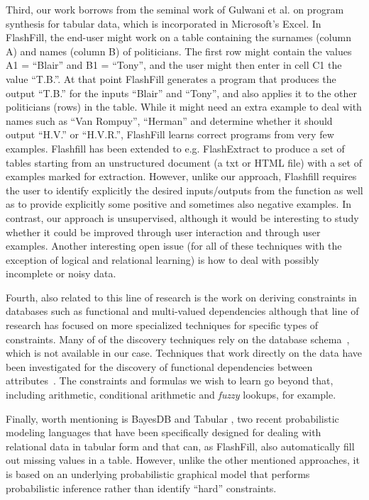 Third, our work borrows from the seminal work of Gulwani et al. \cite{flashfill} on program synthesis for tabular data, which is incorporated in Microsoft’s Excel. In FlashFill, the end-user might work on a table containing the surnames (column A) and names (column B) of politicians. The first row might contain the values A1 = ``Blair'' and B1 = ``Tony'', and the user might then enter in cell C1 the value ``T.B.''. At that point FlashFill generates a program that produces the output ``T.B.'' for the inputs ``Blair'' and ``Tony'', and also applies it to the other politicians (rows) in the table. While it might need an extra example to deal with names such as ``Van Rompuy'', ``Herman'' and determine whether it should output ``H.V.'' or ``H.V.R.'', FlashFill learns correct programs from very few examples. Flashfill has been extended to e.g. FlashExtract \cite{flashextract} to produce a set of tables starting from an unstructured document (a txt or HTML file) with a set of examples marked for extraction. However, unlike our approach, Flashfill requires the user to identify explicitly the desired inputs/outputs from the function as well as to provide explicitly some positive and sometimes also negative examples.  In contrast, our approach is unsupervised, although it would be interesting to study whether it could be improved through user interaction and through user examples.  Another interesting open issue (for all of these techniques with the exception of logical and relational learning) is how to deal with possibly incomplete or noisy data.

Fourth, also related to this line of research is the work on deriving constraints in databases such as functional and multi-valued dependencies \cite{savnik, Mannila-Raiha} although that line of research has focused on more specialized techniques for specific types of constraints. Many of of the discovery techniques rely on the database schema~\cite{flach_dependency_discovery}, which is not available in our case. Techniques that work directly on the data have been investigated for the discovery of functional dependencies between attributes~\cite{tane_dependency_discovery}. The constraints and formulas we wish to learn go beyond that, including arithmetic, conditional arithmetic and \textit{fuzzy} lookups, for example.

Finally, worth mentioning is BayesDB \cite{BayesDB} and Tabular \cite{tabular}, two recent probabilistic modeling languages that have been specifically designed for dealing with relational data in tabular form and that can, as FlashFill, also automatically fill out missing values in a table.  However, unlike the other mentioned approaches, it is based on an underlying probabilistic graphical model that performs probabilistic inference rather than identify ``hard'' constraints.


